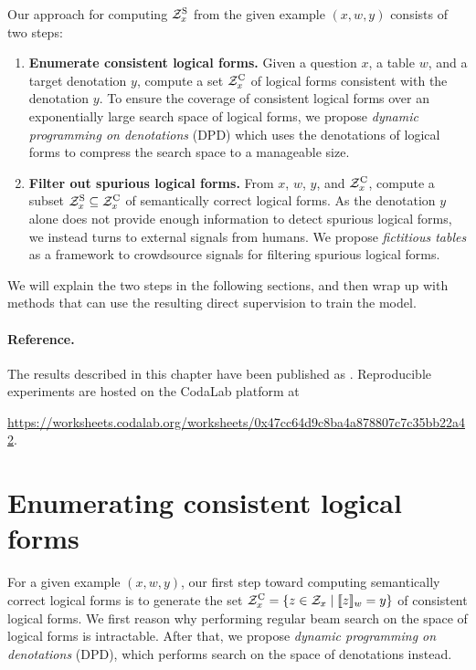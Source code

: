Our approach for computing $\mathcal{Z}^\mathrm{S}_x$ from the given example
$(x, w, y)$ consists of two steps:
\begin{enumerate}
\item \textbf{Enumerate consistent logical forms.}
Given a question $x$, a table $w$, and a target denotation $y$,
compute a set $\mathcal{Z}^\mathrm{C}_x$ of logical forms consistent with
the denotation $y$.
To ensure the coverage of consistent logical forms
over an exponentially large search space of logical forms,
we propose \emph{dynamic programming on denotations} (DPD)
which uses the denotations of logical forms
to compress the search space to a manageable size.

\item \textbf{Filter out spurious logical forms.}
From $x$, $w$, $y$, and $\mathcal{Z}^\mathrm{C}_x$,
compute a subset $\mathcal{Z}^\mathrm{S}_x \subseteq \mathcal{Z}^\mathrm{C}_x$
of semantically correct logical forms.
As the denotation $y$ alone does not provide enough information
to detect spurious logical forms,
we instead turns to external signals from humans.
We propose \emph{fictitious tables}
as a framework to crowdsource signals for filtering
spurious logical forms.
\end{enumerate}

We will explain the two steps in the following sections,
and then wrap up with methods that can use the resulting
direct supervision to train the model.

\paragraph{Reference.}
The results described in this chapter have been published as
\cite{pasupat2016inferring}.
Reproducible experiments are hosted on the
CodaLab platform at
\begin{center}
\small
\url{https://worksheets.codalab.org/worksheets/0x47cc64d9c8ba4a878807c7c35bb22a42}.
\end{center}

\section{Enumerating consistent logical forms}
For a given example $(x, w, y)$,
our first step toward computing
semantically correct logical forms
is to generate the set $\mathcal{Z}^\mathrm{C}_x = \left\{ z \in \mathcal{Z}_x \mid \llbracket{z}\rrbracket_{w} = y \right\}$
of consistent logical forms.
We first reason why performing regular beam search
on the space of logical forms is intractable.
After that, we propose
\emph{dynamic programming on denotations} (DPD),
which performs search on the space of denotations instead.

